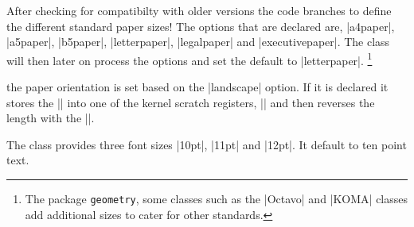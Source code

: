\begin{teX}
\newcommand\@ptsize{}
\newif\if@restonecol
\newif\if@titlepage \@titlepagetrue
\newif\if@openright
\newif\if@mainmatter \@mainmattertrue
\end{teX}


 After checking for compatibilty with older versions the code branches to define the different standard paper sizes! The options that are declared are, |a4paper|, |a5paper|, |b5paper|, |letterpaper|, |legalpaper| and  |executivepaper|. The class will then later on process the options and set the default to |letterpaper|. \footnote{The package \texttt{geometry}, some classes such as the |Octavo| and |KOMA| classes add additional sizes to cater for other standards.}

\begin{teX}
\if@compatibility\else
{}
   {\setlength\paperheight {297mm}%
    \setlength\paperwidth  {210mm}}
   {\setlength\paperheight {210mm}%
    \setlength\paperwidth  {148mm}}
   {\setlength\paperheight {250mm}%
    \setlength\paperwidth  {176mm}}
   {\setlength\paperheight {11in}%
    \setlength\paperwidth  {8.5in}}
   {\setlength\paperheight {14in}%
    \setlength\paperwidth  {8.5in}}
   {\setlength\paperheight {10.5in}%
    \setlength\paperwidth  {7.25in}}
\end{teX}

\begin{multicols}{2}
 the paper orientation is set based on the |landscape| option. If it is declared it stores the |\paperheight| into one of the \latex kernel scratch registers, |\@tempdima| and then reverses the length with the |\paperwidth|.
\end{multicols}


\begin{teX}
   {\setlength\@tempdima   {\paperheight}%
    \setlength\paperheight {\paperwidth}%
    \setlength\paperwidth  {\@tempdima}}
\fi
\end{teX}

\begin{multicols}{2}
 The class provides three font sizes |10pt|, |11pt| and |12pt|. It default to ten point text.
\end{multicols}

\begin{teX}
\if@compatibility
  \renewcommand\@ptsize{0}
\else
\DeclareOption{10pt}{\renewcommand\@ptsize{0}}
\fi
\DeclareOption{11pt}{\renewcommand\@ptsize{1}}
\DeclareOption{12pt}{\renewcommand\@ptsize{2}}
\end{teX}

